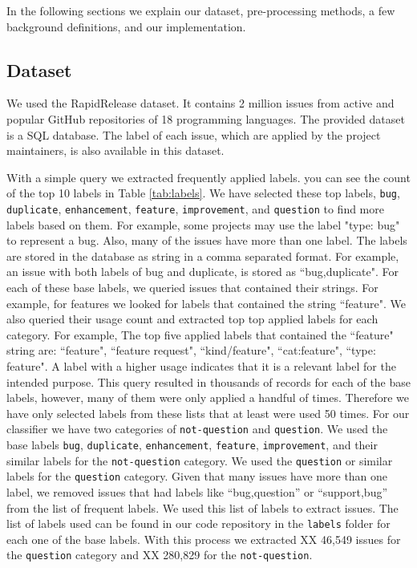 \documentclass[conference]{IEEEtran}
\begin{document}
In the following sections we explain our dataset, pre-processing methods, a few background definitions, and
our implementation.

\subsection{Dataset}
We used the RapidRelease \cite{8816794} dataset. It contains 2 million issues from active and popular 
GitHub repositories of 18 programming languages. The provided dataset is a SQL database.
The label of each issue, which are applied by the project maintainers, is also available in this dataset.

With a simple query we extracted frequently applied labels. you 
can see the count of the top 10 labels in Table \ref{tab:labels}. 
We have selected these top labels, \verb|bug|, \verb|duplicate|, \verb|enhancement|,
\verb|feature|, \verb|improvement|, and \verb|question| to find more labels based on them.
For example, some projects may use the label "type: bug" to represent a bug. Also, many of the issues 
have more than one label. The labels are stored in the database as string in a comma separated format. 
For example, an issue with both labels of bug and duplicate, is stored as ``bug,duplicate". 
For each of these base labels, we queried issues that contained their strings. For example,
for features we looked for labels that contained the string ``feature". We also queried their usage count and
extracted top top applied labels for each category.
For example, The top five applied labels that contained the ``feature" string 
are: ``feature", ``feature request", ``kind/feature", ``cat:feature", ``type: feature".
A label with a higher usage indicates that it is a relevant label for the intended purpose. This query resulted
in thousands of records for each of the base labels, however, many of them were only applied
a handful of times. Therefore we have only selected labels from these lists that 
at least were used 50 times. For our classifier we have two categories of \verb|not-question| 
and \verb|question|. We used the base labels \verb|bug|, \verb|duplicate|, \verb|enhancement|,
\verb|feature|, \verb|improvement|, and their similar labels for the \verb|not-question| category. We used
the \verb|question| or similar labels for the \verb|question| category. Given that many issues have 
more than one label, we removed issues that had labels like ``bug,question'' or ``support,bug'' from 
the list of frequent labels. We used this list of labels to extract issues. The list of labels
used can be found in our code repository in the \verb|labels| folder for each one of the base labels.
With this process we extracted XX 46,549 issues for the \verb|question| category and XX 280,829 for 
the \verb|not-question|.
\end{document}
